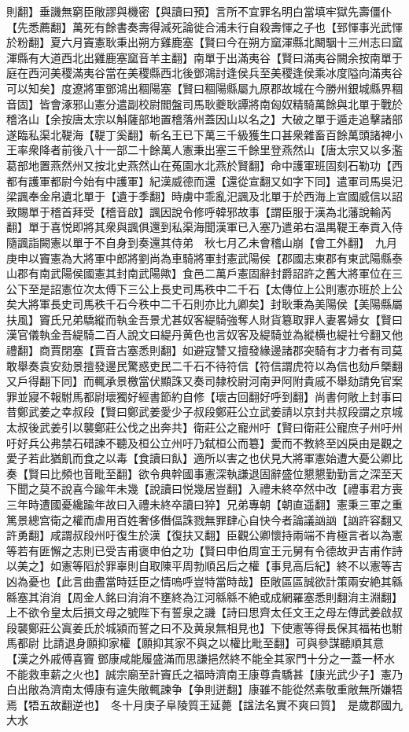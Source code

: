 則翻】垂譏無窮臣敞謬與機密【與讀曰預】言所不宜罪名明白當填牢獄先壽僵仆【先悉薦翻】萬死有餘書奏壽得減死論徙合浦未行自殺壽惲之子也【郅惲事光武惲於粉翻】夏六月竇憲耿秉出朔方雞鹿塞【賢曰今在朔方窳渾縣北闞駰十三州志曰窳渾縣有大道西北出雞鹿塞窳音羊主翻】南單于出滿夷谷【賢曰滿夷谷闕余按南單于庭在西河美稷滿夷谷當在美稷縣西北後鄧鴻討逢侯兵至美稷逢侯乘冰度隘向滿夷谷可以知矣】度遼將軍鄧鴻出稒陽塞【賢曰稒陽縣屬九原郡故城在今勝州銀城縣界稒音固】皆會涿邪山憲分遣副校尉閻盤司馬耿夔耿譚將南匈奴精騎萬餘與北單于戰於稽洛山【余按唐太宗以斛薩部地置稽落州蓋因山以名之】大破之單于遁走追擊諸部遂臨私渠北鞮海【鞮丁奚翻】斬名王已下萬三千級獲生口甚衆雜畜百餘萬頭諸裨小王率衆降者前後八十一部二十餘萬人憲秉出塞三千餘里登燕然山【唐太宗又以多濫葛部地置燕然州又按北史燕然山在菟園水北燕於賢翻】命中護軍班固刻石勒功【西都有護軍都尉今始有中護軍】紀漢威德而還【還從宣翻又如字下同】遣軍司馬吳汜梁諷奉金帛遺北單于【遺于季翻】時虜中乖亂汜諷及北單于於西海上宣國威信以詔致賜單于稽首拜受【稽音啟】諷因說令修呼韓邪故事【謂臣服于漢為北藩說輸芮翻】單于喜悦即將其衆與諷俱還到私渠海聞漢軍已入塞乃遣弟右温禺鞮王奉貢入侍隨諷詣闕憲以單于不自身到奏還其侍弟　秋七月乙未會稽山崩【會工外翻】　九月庚申以竇憲為大將軍中郎將劉尚為車騎將軍封憲武陽侯【郡國志東郡有東武陽縣泰山郡有南武陽侯國憲其封南武陽歟】食邑二萬戶憲固辭封爵詔許之舊大將軍位在三公下至是詔憲位次太傅下三公上長史司馬秩中二千石【太傳位上公則憲亦班於上公矣大將軍長史司馬秩千石今秩中二千石則亦比九卿矣】封耿秉為美陽侯【美陽縣屬扶風】竇氏兄弟驕縱而執金吾景尤甚奴客緹騎強奪人財貨簒取罪人妻畧婦女【賢曰漢官儀執金吾緹騎二百人說文曰緹丹黄色也言奴客及緹騎並為縱横也緹社兮翻又他禮翻】商賈閉塞【賈音古塞悉則翻】如避寇讐又擅發緣邊諸郡突騎有才力者有司莫敢舉奏袁安劾景擅發邊民驚惑吏民二千石不待符信【符信謂虎符以為信也劾戶槩翻又戶得翻下同】而輒承景檄當伏顯誅又奏司隸校尉河南尹阿附貴戚不舉劾請免官案罪並寢不報駙馬都尉瓌獨好經書節約自修【瓌古回翻好呼到翻】尚書何敞上封事曰昔鄭武姜之幸叔段【賢曰鄭武姜愛少子叔段鄭莊公立武姜請以京封共叔段謂之京城太叔後武姜引以襲鄭莊公伐之出奔共】衛莊公之寵州吁【賢曰衛莊公寵庶子州吁州吁好兵公弗禁石碏諫不聽及桓公立州吁乃弑桓公而簒】愛而不教終至凶戾由是觀之愛子若此猶飢而食之以毒【食讀曰飤】適所以害之也伏見大將軍憲始遭大憂公卿比奏【賢曰比頻也音毗至翻】欲令典幹國事憲深執謙退固辭盛位懇懇勤勤言之深至天下聞之莫不說喜今踰年未幾【說讀曰悦幾居豈翻】入禮未終卒然中改【禮事君方喪三年時遭國憂纔踰年故曰入禮未終卒讀曰猝】兄弟專朝【朝直遥翻】憲秉三軍之重篤景總宫衛之權而虐用百姓奢侈僭偪誅戮無罪肆心自快今者論議訩訩【訩許容翻又許勇翻】咸謂叔段州吁復生於漢【復扶又翻】臣觀公卿懷持兩端不肯極言者以為憲等若有匪懈之志則已受吉甫褒申伯之功【賢曰申伯周宣王元舅有令德故尹吉甫作詩以美之】如憲等䧟於罪辜則自取陳平周勃順呂后之權【事見高后紀】終不以憲等吉凶為憂也【此言曲盡當時廷臣之情嗚呼豈特當時哉】臣敞區區誠欲計策兩安絶其緜緜塞其㳙㳙【周金人銘曰㳙㳙不壅終為江河緜緜不絶或成網羅塞悉則翻㳙主淵翻】上不欲令皇太后損文母之號陛下有誓泉之譏【詩曰思齊太任文王之母左傳武姜啟叔段襲鄭莊公寘姜氏於城潁而誓之曰不及黄泉無相見也】下使憲等得長保其福祐也駙馬都尉比請退身願抑家權【願抑其家不與之以權比毗至翻】可與參謀聽順其意【漢之外戚傅喜竇鄧康咸能履盛滿而思謙挹然終不能全其家門十分之一蓋一杯水不能救車薪之火也】誠宗廟至計竇氏之福時濟南王康尊貴驕甚【康光武少子】憲乃白出敞為濟南太傅康有違失敞輒諫争【争則迸翻】康雖不能從然素敬重敞無所嫌牾焉【牾五故翻逆也】　冬十月庚子阜陵質王延薨【諡法名實不爽曰質】　是歲郡國九大水

